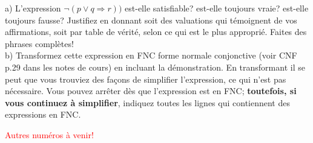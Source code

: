 \documentclass[12pt]{article}
\newcommand{\REMISE}[1]{}
\newcommand{\rouge}[1]{\textcolor{red}{#1}}
\newcommand{\V}{\mbox{\tt v}}
\newcommand{\F}{\mbox{\tt f}}
\newcommand{\non}{\neg}                  %
\newcommand{\ou}{\vee}                   %
\newcommand{\implique}{\Rightarrow}      %
\newcounter{exercice}\newcommand{\exercice}{\bigskip \addtocounter{exercice}{1}\noindent \textbf{Exercice \theexercice}\\}
\newcommand{\reponse}[1]{\REMISE{\vspace{.5cm}\noindent\textbf{Réponse : } #1 \vfill}}
\begin{document}
%
\exercice
a) L'expression $\non (p \ou q\implique  r)) $ est-elle satisfiable? est-elle toujours vraie?  est-elle toujours fausse? Justifiez   en donnant soit des valuations qui témoignent de vos affirmations, soit par table de vérité, selon ce qui est le plus approprié. Faites des phrases complètes!
\\
b) Transformez cette expression en FNC forme normale conjonctive (voir CNF p.29 dans les notes de cours) en incluant la démonstration. En transformant il se peut que vous trouviez des façons de simplifier l'expression, ce qui n'est pas nécessaire. Vous pouvez arrêter dès que l'expression est en FNC;  \textbf{toutefois, si vous continuez à simplifier}, indiquez toutes les lignes qui contiennent des expressions en FNC.
\reponse{
}
\vfill

\textcolor{red}{Autres numéros à venir!}
\end{document}
